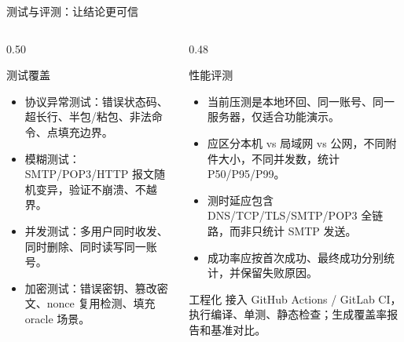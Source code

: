 \documentclass[aspectratio=169,10pt]{beamer}
\begin{document}
\begin{frame}{测试与评测：让结论更可信}
  \begin{columns}[T]
    \begin{column}{0.50\textwidth}
      \begin{block}{测试覆盖}
        \small
        \begin{itemize}
          \item 协议异常测试：错误状态码、超长行、半包/粘包、非法命令、点填充边界。
          \item 模糊测试：SMTP/POP3/HTTP 报文随机变异，验证不崩溃、不越界。
          \item 并发测试：多用户同时收发、同时删除、同时读写同一账号。
          \item 加密测试：错误密钥、篡改密文、nonce 复用检测、填充 oracle 场景。
        \end{itemize}
      \end{block}
    \end{column}
    \begin{column}{0.48\textwidth}
      \begin{block}{性能评测}
        \small
        \begin{itemize}
          \item 当前压测是本地环回、同一账号、同一服务器，仅适合功能演示。
          \item 应区分本机 vs 局域网 vs 公网，不同附件大小，不同并发数，统计 P50/P95/P99。
          \item 测时延应包含 DNS/TCP/TLS/SMTP/POP3 全链路，而非只统计 SMTP 发送。
          \item 成功率应按首次成功、最终成功分别统计，并保留失败原因。
        \end{itemize}
      \end{block}
      \begin{block}{工程化}
        \small
        接入 GitHub Actions / GitLab CI，执行编译、单测、静态检查；生成覆盖率报告和基准对比。
      \end{block}
    \end{column}
  \end{columns}
\end{frame}
\end{document}
